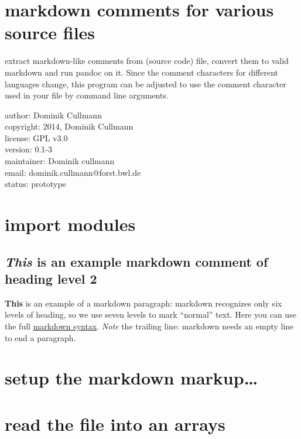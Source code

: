 \documentclass[]{article}
\date{}
\begin{document}
\section{markdown comments for various source
files}\label{markdown-comments-for-various-source-files}

extract markdown-like comments from (source code) file, convert them to
valid markdown and run pandoc on it. Since the comment characters for
different languages change, this program can be adjusted to use the
comment character used in your file by command line arguments.

author: Dominik Cullmann\\
 copyright: 2014, Dominik Cullmann\\
 license: GPL v3.0\\
 version: 0.1-3\\
 maintainer: Dominik cullmann\\
 email: dominik.cullmann@forst.bwl.de\\
 status: prototype

\section{import modules}\label{import-modules}

\subsection{\texorpdfstring{\emph{This} is an example markdown comment
of heading level
2}{This is an example markdown comment of heading level 2}}\label{this-is-an-example-markdown-comment-of-heading-level-2}

\textbf{This} is an example of a markdown paragraph: markdown recognizes
only six levels of heading, so we use seven levels to mark ``normal''
text. Here you can use the full
\href{http://daringfireball.net/projects/markdown/syntax}{markdown
syntax}. \emph{Note} the trailing line: markdown needs an empty line to
end a paragraph.

\section{setup the markdown
markup\ldots{}}\label{setup-the-markdown-markup}

\section{read the file into an
arrays}\label{read-the-file-into-an-arrays}
\end{document}
